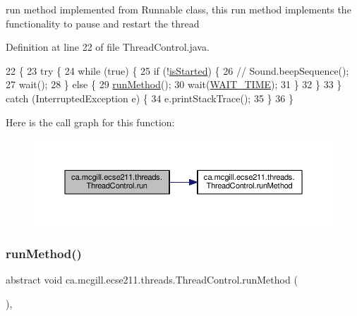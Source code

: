 run method implemented from Runnable class, this run method implements the functionality to pause and restart the thread 

Definition at line 22 of file Thread\+Control.\+java.


\begin{DoxyCode}
22                                  \{
23     \textcolor{keywordflow}{try} \{
24       \textcolor{keywordflow}{while} (\textcolor{keyword}{true}) \{
25         \textcolor{keywordflow}{if} (!\hyperlink{classca_1_1mcgill_1_1ecse211_1_1threads_1_1_thread_control_a92f4933511db42476e39956246bcf2fe}{isStarted}) \{
26   \textcolor{comment}{//        Sound.beepSequence();}
27           wait();
28         \} \textcolor{keywordflow}{else} \{
29           \hyperlink{classca_1_1mcgill_1_1ecse211_1_1threads_1_1_thread_control_a2959c54bdb6c62c9d5569cdf3ccf2418}{runMethod}();
30           wait(\hyperlink{classca_1_1mcgill_1_1ecse211_1_1threads_1_1_thread_control_a395cfe1d73b3ef14da0830ed0a499f82}{WAIT\_TIME});
31         \}
32       \}
33     \} \textcolor{keywordflow}{catch} (InterruptedException e) \{
34       e.printStackTrace();
35     \}
36   \}
\end{DoxyCode}
Here is the call graph for this function\+:\nopagebreak
\begin{figure}[H]
\begin{center}
\leavevmode
\includegraphics[width=350pt]{classca_1_1mcgill_1_1ecse211_1_1threads_1_1_thread_control_a03e743000ea2c37080427565e8ec5f35_cgraph}
\end{center}
\end{figure}
\mbox{\label{classca_1_1mcgill_1_1ecse211_1_1threads_1_1_thread_control_a2959c54bdb6c62c9d5569cdf3ccf2418}} 
\subsubsection{\texorpdfstring{run\+Method()}{runMethod()}}
{\footnotesize\ttfamily abstract void ca.\+mcgill.\+ecse211.\+threads.\+Thread\+Control.\+run\+Method (\begin{DoxyParamCaption}{ }\end{DoxyParamCaption})\hspace{0.3cm}{\ttfamily [abstract]}, {\ttfamily [protected]}}


